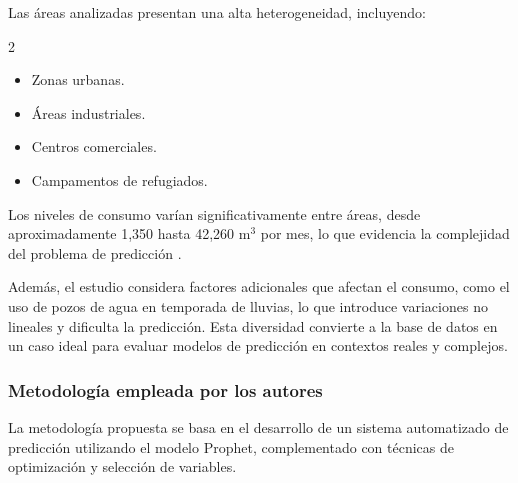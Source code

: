 Las áreas analizadas presentan una alta heterogeneidad, incluyendo:
\begin{multicols}{2}
\begin{itemize}
    \item Zonas urbanas.
    \item Áreas industriales.
    \item Centros comerciales.
    \item Campamentos de refugiados.
\end{itemize}
\end{multicols}
Los niveles de consumo varían significativamente entre áreas, desde aproximadamente 1,350 hasta 42,260 m$^3$ por mes, lo que evidencia la complejidad del problema de predicción \cite{ref_agua}.

Además, el estudio considera factores adicionales que afectan el consumo, como el uso de pozos de agua en temporada de lluvias, lo que introduce variaciones no lineales y dificulta la predicción. Esta diversidad convierte a la base de datos en un caso ideal para evaluar modelos de predicción en contextos reales y complejos.

\subsubsection{Metodología empleada por los autores}

La metodología propuesta se basa en el desarrollo de un sistema automatizado de predicción utilizando el modelo Prophet, complementado con técnicas de optimización y selección de variables.

